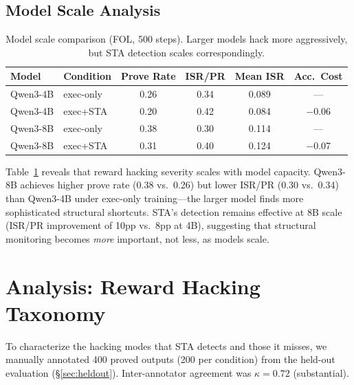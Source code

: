 \documentclass[11pt,a4paper]{article}
\begin{document}
\subsection{Model Scale Analysis}

\begin{table}[t]
\centering
\small
\caption{Model scale comparison (FOL, 500 steps). Larger models hack more aggressively, but STA detection scales correspondingly.}
\label{tab:scale}
\begin{tabular}{llcccc}
\toprule
Model & Condition & Prove Rate & ISR/PR & Mean ISR & Acc.\ Cost \\
\midrule
Qwen3-4B & exec-only & 0.26 & 0.34 & 0.089 & --- \\
Qwen3-4B & exec+STA  & 0.20 & 0.42 & 0.084 & $-$0.06 \\
Qwen3-8B & exec-only & 0.38 & 0.30 & 0.114 & --- \\
Qwen3-8B & exec+STA  & 0.31 & 0.40 & 0.124 & $-$0.07 \\
\bottomrule
\end{tabular}
\end{table}

Table~\ref{tab:scale} reveals that reward hacking severity scales with model capacity.
Qwen3-8B achieves higher prove rate (0.38 vs.\ 0.26) but lower ISR/PR (0.30 vs.\ 0.34) than Qwen3-4B under exec-only training---the larger model finds more sophisticated structural shortcuts.
STA's detection remains effective at 8B scale (ISR/PR improvement of 10pp vs.\ 8pp at 4B), suggesting that structural monitoring becomes \emph{more} important, not less, as models scale.

\section{Analysis: Reward Hacking Taxonomy}
\label{sec:taxonomy}

To characterize the hacking modes that STA detects and those it misses, we manually annotated 400 proved outputs (200 per condition) from the held-out evaluation (\S\ref{sec:heldout}).
Inter-annotator agreement was $\kappa = 0.72$ (substantial).
\end{document}
